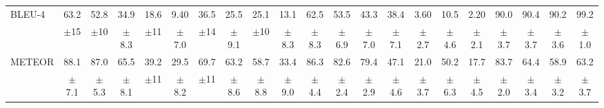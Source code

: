 \documentclass[main.tex]{subfiles}
\begin{document}
\begin{table}[t]
{\begin{tabular}{l|cccccccccc@{\hskip 2pt}|cccccccccc}
\multirow{2}{*}{BLEU-4} & {\normalsize 63.2} & {\normalsize 52.8} & {\normalsize 34.9} & {\normalsize 18.6} & {\normalsize 9.40} & {\normalsize 36.5} & {\normalsize 25.5} & {\normalsize 25.1} & {\normalsize 13.1} & {\normalsize 62.5} & {\normalsize 53.5} & {\normalsize 43.3} & {\normalsize 38.4} & {\normalsize 3.60} & {\normalsize 10.5} & {\normalsize 2.20} & {\normalsize 90.0} & {\normalsize 90.4} & {\normalsize 90.2} & {\normalsize 99.2} \\
& {\footnotesize $\pm$15} & {\footnotesize $\pm$10} & {\footnotesize $\pm$8.3} & {\footnotesize $\pm$11} & {\footnotesize $\pm$7.0} & {\footnotesize $\pm$14} & {\footnotesize $\pm$9.1} & {\footnotesize $\pm$10} & {\footnotesize $\pm$8.3} & {\footnotesize $\pm$8.3} & {\footnotesize $\pm$6.9} & {\footnotesize $\pm$7.0} & {\footnotesize $\pm$7.1} & {\footnotesize $\pm$2.7} & {\footnotesize $\pm$4.6} & {\footnotesize $\pm$2.1} & {\footnotesize $\pm$3.7} & {\footnotesize $\pm$3.7} & {\footnotesize $\pm$3.6} & {\footnotesize $\pm$1.0} \\
\cline{2-21}

\multirow{2}{*}{METEOR} & {\normalsize 88.1} & {\normalsize 87.0} & {\normalsize 65.5} & {\normalsize 39.2} & {\normalsize 29.5} & {\normalsize 69.7} & {\normalsize 63.2} & {\normalsize 58.7} & {\normalsize 33.4} & {\normalsize 86.3} & {\normalsize 82.6} & {\normalsize 79.4} & {\normalsize 47.1} & {\normalsize 21.0} & {\normalsize 50.2} & {\normalsize 17.7} & {\normalsize 83.7} & {\normalsize 64.4} & {\normalsize 58.9} & {\normalsize 63.2} \\
& {\footnotesize $\pm$7.1} & {\footnotesize $\pm$5.3} & {\footnotesize $\pm$8.1} & {\footnotesize $\pm$11} & {\footnotesize $\pm$8.2} & {\footnotesize $\pm$11} & {\footnotesize $\pm$8.6} & {\footnotesize $\pm$8.8} & {\footnotesize $\pm$9.0} & {\footnotesize $\pm$4.4} & {\footnotesize $\pm$2.4} & {\footnotesize $\pm$2.9} & {\footnotesize $\pm$4.6} & {\footnotesize $\pm$3.7} & {\footnotesize $\pm$6.3} & {\footnotesize $\pm$4.5} & {\footnotesize $\pm$2.0} & {\footnotesize $\pm$3.4} & {\footnotesize $\pm$3.2} & {\footnotesize $\pm$3.7} \\
\cline{2-21}


\end{tabular}}
\end{table}
\end{document}
